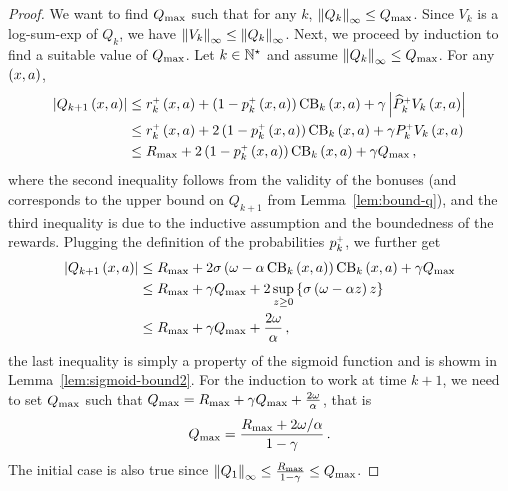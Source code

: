 \begin{proof}
    We want to find $Q_{\max}$ such that for any $k$, $\left\|Q_k\right\|_\infty \leq Q_{\max}$. Since $V_k$ is a log-sum-exp of $Q_k$, we have $\left\|V_k\right\|_\infty \leq \left\|Q_k\right\|_\infty$. Next, we proceed by induction to find a suitable value of $Q_{\max}$. Let $k \in \mathbb{N}^\star$ and assume $\left\|Q_k\right\|_\infty \leq Q_{\max}$. For any $\left( x, a \right)$,
    \begin{align*}
        \left|Q_{k+1} \left( x, a \right)\right| &\leq r_k^{\mathsf{\scriptscriptstyle +}} \left( x, a \right) + \left( 1 - p_k^{\mathsf{\scriptscriptstyle +}} \left( x, a \right) \right) \operatorname{CB}_k \left( x, a \right) + \gamma \left|\widehat{P}_k^\mathsf{\scriptscriptstyle +} V_k \left( x, a \right)\right| \\
        &\leq r_k^{\mathsf{\scriptscriptstyle +}} \left( x, a \right) + 2 \left( 1 - p_k^{\mathsf{\scriptscriptstyle +}} \left( x, a \right) \right) \operatorname{CB}_k \left( x, a \right) + \gamma P_k^\mathsf{\scriptscriptstyle +} V_k \left( x, a \right) \\
        &\leq R_{\max} + 2 \left( 1 - p_k^{\mathsf{\scriptscriptstyle +}} \left( x, a \right) \right) \operatorname{CB}_k \left( x, a \right) + \gamma Q_{\max}\,,
    \end{align*}
    where the second inequality follows from the validity of the bonuses (and corresponds to the upper bound on $Q_{k+1}$ from Lemma~\ref{lem:bound-q}), and the third inequality is due to the inductive assumption and the boundedness of the rewards. Plugging the definition of the probabilities $p_k^{\mathsf{\scriptscriptstyle +}}$, we further get
    \begin{align*}
        \left|Q_{k+1} \left( x, a \right)\right| &\leq R_{\max} + 2 \sigma \left( \omega - \alpha \operatorname{CB}_k \left( x, a \right) \right) \operatorname{CB}_k \left( x, a \right) + \gamma Q_{\max} \\
        &\leq R_{\max} + \gamma Q_{\max} + 2 \sup_{z \geq 0} \left\{ \sigma \left( \omega - \alpha z \right) z \right\} \\
        &\leq R_{\max} + \gamma Q_{\max} + \frac{2 \omega}{\alpha}\,,
    \end{align*}
    the last inequality is simply a property of the sigmoid function and is showm in Lemma~\ref{lem:sigmoid-bound2}. For the induction to work at time $k + 1$, we need to set $Q_{\max}$ such that $Q_{\max} = R_{\max} + \gamma Q_{\max} + \frac{2 \omega}{\alpha}$, that is
    \begin{equation*}
        Q_{\max} = \frac{R_{\max} + 2 \omega / \alpha}{1 - \gamma}\,.
    \end{equation*}
    The initial case is also true since $\left\|Q_1\right\|_\infty \leq \frac{R_{\max}}{1 - \gamma} \leq Q_{\max}$.
\end{proof}



